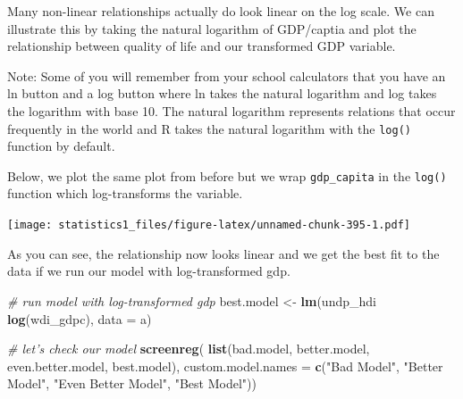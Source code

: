 \documentclass[]{article}
\newenvironment{Shaded}{\begin{snugshade}}{\end{snugshade}}
\newcommand{\KeywordTok}[1]{\textcolor[rgb]{0.13,0.29,0.53}{\textbf{#1}}}
\newcommand{\DataTypeTok}[1]{\textcolor[rgb]{0.13,0.29,0.53}{#1}}
\newcommand{\DecValTok}[1]{\textcolor[rgb]{0.00,0.00,0.81}{#1}}
\newcommand{\StringTok}[1]{\textcolor[rgb]{0.31,0.60,0.02}{#1}}
\newcommand{\CommentTok}[1]{\textcolor[rgb]{0.56,0.35,0.01}{\textit{#1}}}
\newcommand{\OtherTok}[1]{\textcolor[rgb]{0.56,0.35,0.01}{#1}}
\newcommand{\OperatorTok}[1]{\textcolor[rgb]{0.81,0.36,0.00}{\textbf{#1}}}
\newcommand{\NormalTok}[1]{#1}
\theoremstyle{definition}
\theoremstyle{definition}
\theoremstyle{definition}
\theoremstyle{remark}
\begin{document}
Many non-linear relationships actually do look linear on the log scale.
We can illustrate this by taking the natural logarithm of GDP/captia and
plot the relationship between quality of life and our transformed GDP
variable.

Note: Some of you will remember from your school calculators that you
have an ln button and a log button where ln takes the natural logarithm
and log takes the logarithm with base 10. The natural logarithm
represents relations that occur frequently in the world and R takes the
natural logarithm with the \texttt{log()} function by default.

Below, we plot the same plot from before but we wrap
\texttt{gdp\_capita} in the \texttt{log()} function which log-transforms
the variable.

\begin{Shaded}
\end{Shaded}

\texttt{[image: statistics1\_files/figure-latex/unnamed-chunk-395-1.pdf]}

As you can see, the relationship now looks linear and we get the best
fit to the data if we run our model with log-transformed gdp.

\begin{Shaded}
\begin{Highlighting}[]
\CommentTok{# run model with log-transformed gdp}
\NormalTok{best.model <-}\StringTok{ }\KeywordTok{lm}\NormalTok{(undp_hdi }\OperatorTok{~}\StringTok{ }\KeywordTok{log}\NormalTok{(wdi_gdpc), }\DataTypeTok{data =}\NormalTok{ a)}

\CommentTok{# let's check our model}
\KeywordTok{screenreg}\NormalTok{( }\KeywordTok{list}\NormalTok{(bad.model, better.model, even.better.model, best.model),}
           \DataTypeTok{custom.model.names =} \KeywordTok{c}\NormalTok{(}\StringTok{"Bad Model"}\NormalTok{, }\StringTok{"Better Model"}\NormalTok{, }\StringTok{"Even Better Model"}\NormalTok{, }\StringTok{"Best Model"}\NormalTok{))}
\end{Highlighting}
\end{Shaded}
\end{document}
